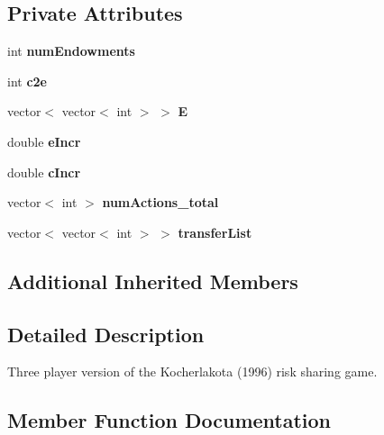 \subsection*{Private Attributes}
\begin{DoxyCompactItemize}
\item 
\mbox{\label{classRiskSharingGame__3Player_ab3687b044f23019a5c66b05675ecd963}} 
int {\bfseries num\+Endowments}
\item 
\mbox{\label{classRiskSharingGame__3Player_a3572e0f51a0cd11fbc34db0f6d323ab5}} 
int {\bfseries c2e}
\item 
\mbox{\label{classRiskSharingGame__3Player_a8ea60c87e78bbcafaf3dbbd8fd7b5712}} 
vector$<$ vector$<$ int $>$ $>$ {\bfseries E}
\item 
\mbox{\label{classRiskSharingGame__3Player_a27081a99338c5dc81faa8ca74d15ba32}} 
double {\bfseries e\+Incr}
\item 
\mbox{\label{classRiskSharingGame__3Player_a2615654d1b8aee618d9f8c1e99e56c33}} 
double {\bfseries c\+Incr}
\item 
\mbox{\label{classRiskSharingGame__3Player_a11819cbe897fd8246c70ae2295a32e6a}} 
vector$<$ int $>$ {\bfseries num\+Actions\+\_\+total}
\item 
\mbox{\label{classRiskSharingGame__3Player_ab42d33f21d8b835aacdc9f2d3813bad0}} 
vector$<$ vector$<$ int $>$ $>$ {\bfseries transfer\+List}
\end{DoxyCompactItemize}
\subsection*{Additional Inherited Members}


\subsection{Detailed Description}
Three player version of the Kocherlakota (1996) risk sharing game. 

\subsection{Member Function Documentation}
\mbox{\label{classRiskSharingGame__3Player_a79f44b04c558ecd72cf0b464fdd8a317}} 
